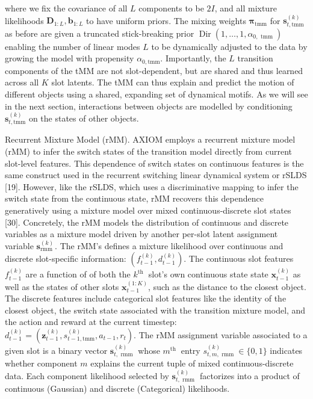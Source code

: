 \documentclass[10pt]{article}
\begin{document}
where we fix the covariance of all $L$ components to be $2 I$, and all mixture likelihoods $\boldsymbol{D}_{1: L}, \boldsymbol{b}_{1: L}$ to have uniform priors. The mixing weights $\boldsymbol{\pi}_{\mathrm{tmm}}$ for $\mathbf{s}_{t, \mathrm{tmm}}^{(k)}$ as before are given a truncated stick-breaking prior $\operatorname{Dir}\left(1, \ldots, 1, \alpha_{0, \text { tmm }}\right)$ enabling the number of linear modes $L$ to be dynamically adjusted to the data by growing the model with propensity $\alpha_{0, \mathrm{tmm}}$. Importantly, the $L$ transition components of the tMM are not slot-dependent, but are shared and thus learned across all $K$ slot latents. The tMM can thus explain and predict the motion of different objects using a shared, expanding set of dynamical motifs. As we will see in the next section, interactions between objects are modelled by conditioning $\mathbf{s}_{t, \mathrm{tmm}}^{(k)}$ on the states of other objects.

Recurrent Mixture Model (rMM). AXIOM employs a recurrent mixture model (rMM) to infer the switch states of the transition model directly from current slot-level features. This dependence of switch states on continuous features is the same construct used in the recurrent switching linear dynamical system or rSLDS [19]. However, like the rSLDS, which uses a discriminative mapping to infer the switch state from the continuous state, rMM recovers this dependence generatively using a mixture model over mixed continuous-discrete slot states [30]. Concretely, the rMM models the distribution of continuous and discrete variables as a mixture model driven by another per-slot latent assignment variable $\mathbf{s}_{\text {rmm }}^{(k)}$. The rMM's defines a mixture likelihood over continuous and discrete slot-specific information: $\left(f_{t-1}^{(k)}, d_{t-1}^{(k)}\right)$. The continuous slot features $f_{t-1}^{(k)}$ are a function of of both the $k^{\text {th }}$ slot's own continuous state state $\mathbf{x}_{t-1}^{(k)}$ as well as the states of other slots $\mathbf{x}_{t-1}^{(1: K)}$, such as the distance to the closest object. The discrete features include categorical slot features like the identity of the closest object, the switch state associated with the transition mixture model, and the action and reward at the current timestep: $d_{t-1}^{(k)}=\left(\mathbf{z}_{t-1}^{(k)}, s_{t-1, \mathrm{tmm}}^{(k)}, a_{t-1}, r_{t}\right)$. The rMM assignment variable associated to a given slot is a binary vector $\mathbf{s}_{t, \text { rmm }}^{(k)}$ whose $m^{\text {th }}$ entry $s_{t, m, \text { rmm }}^{(k)} \in\{0,1\}$ indicates whether component $m$ explains the current tuple of mixed continuous-discrete data. Each component likelihood selected by $\mathbf{s}_{t, \text { rmm }}^{(k)}$ factorizes into a product of continuous (Gaussian) and discrete (Categorical) likelihoods.
\end{document}
